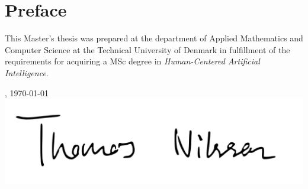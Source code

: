 \chapter{Preface}
This Master's thesis was prepared at the department of Applied Mathematics and Computer Science at the Technical University of Denmark in fulfillment of the requirements for acquiring a MSc degree in \textit{Human-Centered Artificial Intelligence}.

\vfill

{
\centering
    \thesislocation{}, \today\\[1cm]
    \hspace{3cm}\includegraphics[scale=0.4]{graphics/signature.png}\\[1cm]
\begin{flushright}
    \thesisauthor{}
\end{flushright}
}